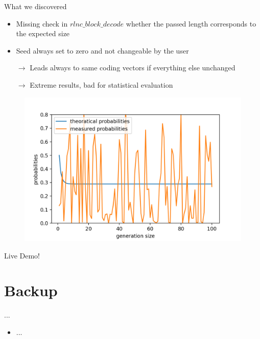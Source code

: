 \documentclass[t]{beamer} %
\begin{document}
\begin{frame}{What we discovered}
  \begin{itemize}
    \item Missing check in \texttt{$rlnc\_block\_decode$} whether the passed length corresponds to the expected size
    \item Seed always set to zero and not changeable by the user
    \item[$\rightarrow$] Leads always to same coding vectors if everything else unchanged
    \item[$\rightarrow$] Extreme results, bad for statistical evaluation
  \end{itemize}
    \begin{figure}[htb]
      \centering
      \includegraphics[scale=0.45]{figures/gf2_noseed}
    \end{figure}
\end{frame}




\begin{frame}[standout]
  Live Demo!
\end{frame}


\appendix
{}
\section{Backup}
\begin{frame}{...}
  \begin{itemize}
    \item ...
  \end{itemize}
\end{frame}
\end{document}
